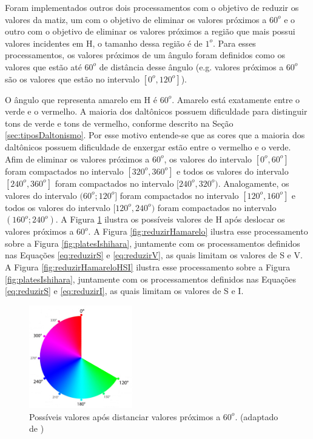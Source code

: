 \documentclass[	12pt, Times, openright, twoside, a4paper, english, brazil]{abntex2}
\begin{document}
Foram implementados outros dois processamentos com o objetivo de reduzir os valores da matiz, um com o objetivo de eliminar os valores próximos a $60^o$ e o outro com o objetivo de eliminar os valores próximos a região que mais possui valores incidentes em H, o tamanho dessa região é de $1^o$. Para esses processamentos, os valores próximos de um ângulo foram definidos como os valores que estão até $60^o$ de distância desse ângulo (e.g. valores próximos a $60^o$ são os valores que estão no intervalo $[0^o,120^o]$).

O ângulo que representa amarelo em H é $60^o$. Amarelo está exatamente entre o verde e o vermelho. A maioria dos daltônicos possuem dificuldade para distinguir tons de verde e tons de vermelho, conforme descrito na Seção \ref{sec:tiposDaltonismo}. Por esse motivo entende-se que as cores que a maioria dos daltônicos possuem dificuldade de enxergar estão entre o vermelho e o verde. Afim de eliminar os valores próximos a $60^o$, os valores do intervalo $[0^o,60^o]$ foram compactados no intervalo $[320^o,360^o]$ e todos os valores do intervalo $[240^o,360^o]$ foram compactados no intervalo $[240^o,320^o)$. Analogamente, os valores do intervalo $(60^o;120^o]$ foram compactados no intervalo $[120^o,160^o]$ e todos os valores do intervalo $[120^o,240^o)$ foram compactados no intervalo $(160^o;240^o)$. A Figura \ref{fig:figuraColorsHamarelo} ilustra os possíveis valores de H após deslocar os valores próximos a $60^o$. A Figura \ref{fig:reduzirHamarelo} ilustra esse processamento sobre a Figura \ref{fig:platesIshihara}, juntamente com os processamentos definidos nas Equações \ref{eq:reduzirS} e \ref{eq:reduzirV}, as quais limitam os valores de S e V. A Figura \ref{fig:reduzirHamareloHSI} ilustra esse processamento sobre a Figura \ref{fig:platesIshihara}, juntamente com os processamentos definidos nas Equações \ref{eq:reduzirS} e \ref{eq:reduzirI}, as quais limitam os valores de S e I.

\begin{figure}[!htb]
\centering \includegraphics[width=0.40\textwidth]{figuraColorsHamarelo.PNG}
\caption{Possíveis valores após distanciar valores próximos a $60^o$. (adaptado de )}
\label{fig:figuraColorsHamarelo}
\end{figure}
\end{document}
